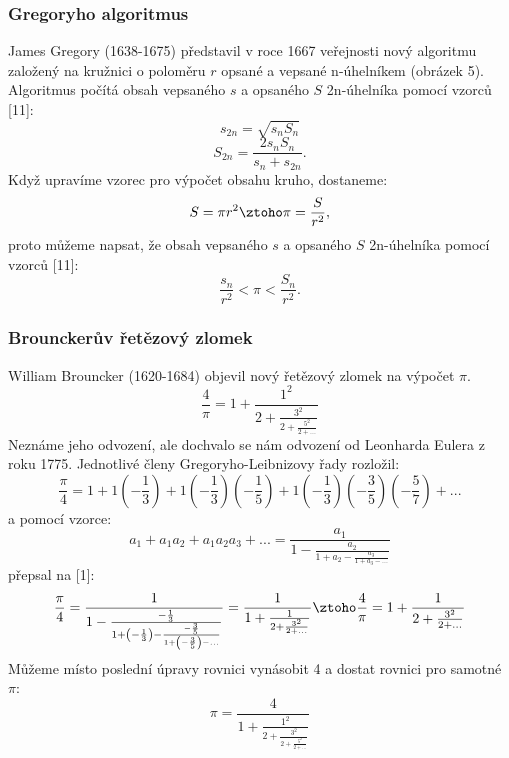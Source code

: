 \documentclass[soc]{gzwroc} %
\begin{document}
\subsubsection{Gregoryho algoritmus}
James Gregory (1638-1675) představil v roce 1667 veřejnosti nový algoritmu založený na kružnici o poloměru $r$ opsané a vepsané n-úhelníkem (obrázek 5). Algoritmus počítá obsah vepsaného $s$ a opsaného $S$ 2n-úhelníka pomocí vzorců [11]:
\begin{equation}
s_{2n}=\sqrt{s_nS_n}
\end{equation}
\begin{equation}
S_{2n}=\frac{2s_nS_n}{s_n+s_{2n}}.
\end{equation}
Když upravíme vzorec pro výpočet obsahu kruho, dostaneme:
$$
S=\pi r^2 \ztoho \pi=\frac{S}{r^2},
$$
proto můžeme napsat, že
obsah vepsaného $s$ a opsaného $S$ 2n-úhelníka pomocí vzorců [11]:
\begin{equation}
\frac{s_n}{r^2}<\pi<\frac{S_n}{r^2}. 
\end{equation}
\subsubsection{Brounckerův řetězový zlomek}
William Brouncker (1620-1684) objevil nový řetězový zlomek na výpočet $\pi$.
\begin{equation}
\frac{4}{\pi}=1+\frac{1^2}{2+\frac{3^2}{2+\frac{5^2}{2+...}}}
\end{equation}
Neznáme jeho odvození, ale dochvalo se nám odvození od Leonharda Eulera z roku 1775. Jednotlivé členy Gregoryho-Leibnizovy řady rozložil:
$$
\frac{\pi}{4}=1+1\left(-\frac{1}{3}\right)+1\left(-\frac{1}{3}\right)\left(-\frac{1}{5}\right)+1\left(-\frac{1}{3}\right)\left(-\frac{3}{5}\right)\left(-\frac{5}{7}\right)+...
$$
a pomocí vzorce:
$$
a_1+a_1a_2+a_1a_2a_3+...=\frac{a_1}{1-\frac{a_2}{1+a_2-\frac{a_3}{1+a_3-...}}}
$$
přepsal na [1]:
$$
\frac{\pi}{4}=\frac{1}{1-\frac{-\frac{1}{3}}{1+\left(-\frac{1}{3}\right)-\frac{-\frac{3}{5}}{1+\left(-\frac{3}{5}\right)-...}}}=\frac{1}{1+\frac{1}{2+\frac{3^2}{2+...}}} \ztoho \frac{4}{\pi}=1+\frac{1}{2+\frac{3^2}{2+...}}
$$
Můžeme místo poslední úpravy rovnici vynásobit 4 a dostat rovnici pro samotné $\pi$:
\begin{equation}
\pi=\frac{4}{1+\frac{1^2}{2+\frac{3^2}{2+\frac{5^2}{2+...}}}}
\end{equation}
\end{document}
